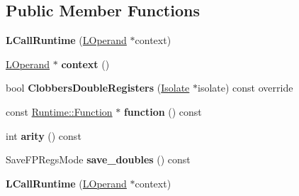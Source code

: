 \subsection*{Public Member Functions}
\begin{DoxyCompactItemize}
\item 
{\bfseries L\+Call\+Runtime} (\hyperlink{classv8_1_1internal_1_1_l_operand}{L\+Operand} $\ast$context)\hypertarget{classv8_1_1internal_1_1_l_call_runtime_a0944b0ab9e1843075170591acb313644}{}\label{classv8_1_1internal_1_1_l_call_runtime_a0944b0ab9e1843075170591acb313644}

\item 
\hyperlink{classv8_1_1internal_1_1_l_operand}{L\+Operand} $\ast$ {\bfseries context} ()\hypertarget{classv8_1_1internal_1_1_l_call_runtime_a53d124954c165c48517bcb9163072229}{}\label{classv8_1_1internal_1_1_l_call_runtime_a53d124954c165c48517bcb9163072229}

\item 
bool {\bfseries Clobbers\+Double\+Registers} (\hyperlink{classv8_1_1internal_1_1_isolate}{Isolate} $\ast$isolate) const  override\hypertarget{classv8_1_1internal_1_1_l_call_runtime_a4bf2712add569c33e2d6106c63c0f1ff}{}\label{classv8_1_1internal_1_1_l_call_runtime_a4bf2712add569c33e2d6106c63c0f1ff}

\item 
const \hyperlink{structv8_1_1internal_1_1_runtime_1_1_function}{Runtime\+::\+Function} $\ast$ {\bfseries function} () const \hypertarget{classv8_1_1internal_1_1_l_call_runtime_ac92d3ff58d96d75e965c38dbbc3ae1ee}{}\label{classv8_1_1internal_1_1_l_call_runtime_ac92d3ff58d96d75e965c38dbbc3ae1ee}

\item 
int {\bfseries arity} () const \hypertarget{classv8_1_1internal_1_1_l_call_runtime_a48b7ab12a64bdad01522b517180dc1f9}{}\label{classv8_1_1internal_1_1_l_call_runtime_a48b7ab12a64bdad01522b517180dc1f9}

\item 
Save\+F\+P\+Regs\+Mode {\bfseries save\+\_\+doubles} () const \hypertarget{classv8_1_1internal_1_1_l_call_runtime_abaa882f65ae172f9475a0ae3ff632509}{}\label{classv8_1_1internal_1_1_l_call_runtime_abaa882f65ae172f9475a0ae3ff632509}

\item 
{\bfseries L\+Call\+Runtime} (\hyperlink{classv8_1_1internal_1_1_l_operand}{L\+Operand} $\ast$context)\hypertarget{classv8_1_1internal_1_1_l_call_runtime_a0944b0ab9e1843075170591acb313644}{}\label{classv8_1_1internal_1_1_l_call_runtime_a0944b0ab9e1843075170591acb313644}


\end{DoxyCompactItemize}
